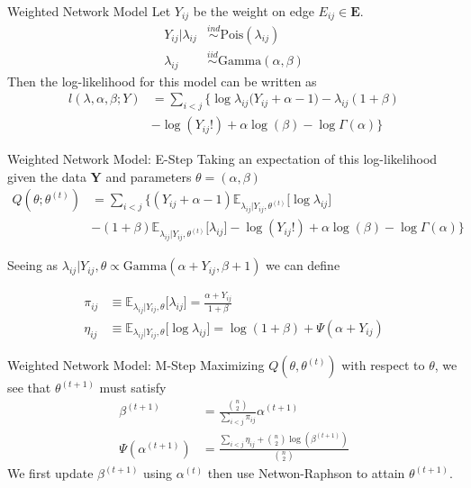 \documentclass[handout]{beamer}
\begin{document}
\begin{frame}{Weighted Network Model}
Let $Y_{ij}$ be the weight on edge $E_{ij}\in \mathbf{E}$.     
    \begin{align*}
    Y_{ij} | \lambda_{ij} &\overset{ind}\sim \text{Pois}(\lambda_{ij}) \\
    \lambda_{ij} &\overset{iid}\sim \text{Gamma}(\alpha, \beta)
\end{align*}
Then the log-likelihood for this model can be written as 
\begin{align*}
l(\lambda, \alpha, \beta ; Y) &= \sum_{i<j}\Big\{ \log \lambda_{ij}\big(Y_{ij} + \alpha - 1) - \lambda_{ij}(1+ \beta)\\
 &-\log(Y_{ij}!) + \alpha \log(\beta) - \log \Gamma(\alpha)\Big\}
\end{align*}
\end{frame}

\begin{frame}{Weighted Network Model: E-Step}
Taking an expectation of this log-likelihood given the data $\mathbf{Y}$ and parameters $\theta = (\alpha, \beta)$ 
\begin{align*}
Q(\theta; \theta^{(t)})  &= \sum_{i<j}\Big\{ (Y_{ij}+ \alpha - 1)\mathbb{E}_{\lambda_{ij}|Y_{ij}, \theta^{(t)}} \big[\log \lambda_{ij}\big] \\
    &- (1+ \beta)\mathbb{E}_{\lambda_{ij}|Y_{ij}, \theta^{(t)}}\big[\lambda_{ij}\big] -\log(Y_{ij}!) + \alpha \log(\beta) - \log \Gamma(\alpha)\Big\}
\end{align*}\pause

Seeing as $\lambda_{ij}|Y_{ij}, \theta \propto \text{Gamma}(\alpha + Y_{ij}, \beta + 1)$  we can define 

\begin{align*}
\pi_{ij} &\equiv \mathbb{E}_{\lambda_{ij}|Y_{ij}, \theta}\big[\lambda_{ij} \big] = \frac{\alpha + Y_{ij}}{1+ \beta} \\
\eta_{ij} &\equiv \mathbb{E}_{\lambda_{ij}|Y_{ij}, \theta}\big[\log \lambda_{ij} \big] = \log(1 + \beta) + \Psi (\alpha + Y_{ij})
\end{align*}

\end{frame}

\begin{frame}{Weighted Network Model: M-Step}
Maximizing $Q(\theta, \theta^{(t)})$ with respect to $\theta$, we see that $\theta^{(t+1)}$ must satisfy 
\begin{align*}
\beta^{(t+1)} &= \frac{\binom{n}{2}}{\sum_{i<j}\pi_{ij}}\alpha^{(t+1)}\\
\Psi(\alpha^{(t+1)}) &= \frac{\sum_{i<j} \eta_{ij} + \binom{n}{2} \log(\beta^{(t+1)})}{\binom{n}{2}} 
\end{align*}
We first update $\beta^{(t+1)}$ using $\alpha^{(t)}$ then use Netwon-Raphson to attain $\theta^{(t+1)}$. 
\end{frame}
\end{document}
